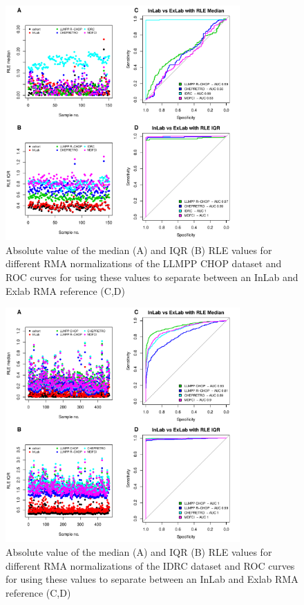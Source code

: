 \documentclass{article}
\begin{document}
\begin{figure}[!h]
	\begin{center}
			\includegraphics[width=0.8\textwidth]{figures/CHOP_rle.pdf}
	\end{center}
	\caption{Absolute value of the median (A) and IQR (B) RLE values for different RMA normalizations of the LLMPP CHOP dataset and ROC curves for using these values to separate between an InLab and Exlab RMA reference (C,D)}
	\label{fig:chop_rle}
\end{figure}

\begin{figure}[!h]
	\begin{center}
			\includegraphics[width=0.8\textwidth]{figures/IDRC_rle.pdf}
	\end{center}
	\caption{Absolute value of the median (A) and IQR (B) RLE values for different RMA normalizations of the IDRC dataset and ROC curves for using these values to separate between an InLab and Exlab RMA reference (C,D)}
	\label{fig:idrc_rle}
\end{figure}
\end{document}
